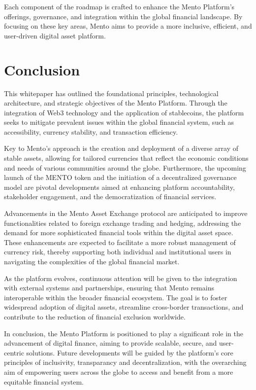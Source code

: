 \documentclass[a4paper]{article}
\theoremstyle{definition}
\begin{document}
Each component of the roadmap is crafted to enhance the Mento Platform's offerings, governance, and integration within the global financial landscape. By focusing on these key areas, Mento aims to provide a more inclusive, efficient, and user-driven digital asset platform.

\section{Conclusion}
\label{sec:conclusion}
This whitepaper has outlined the foundational principles, technological architecture, and strategic objectives of the Mento Platform. Through the integration of Web3 technology and the application of stablecoins, the platform seeks to mitigate prevalent issues within the global financial system, such as accessibility, currency stability, and transaction efficiency.

Key to Mento's approach is the creation and deployment of a diverse array of stable assets, allowing for tailored currencies that reflect the economic conditions and needs of various communities around the globe. Furthermore, the upcoming launch of the MENTO token and the initiation of a decentralized governance model are pivotal developments aimed at enhancing platform accountability, stakeholder engagement, and the democratization of financial services.

Advancements in the Mento Asset Exchange protocol are anticipated to improve functionalities related to foreign exchange trading and hedging, addressing the demand for more sophisticated financial tools within the digital asset space. These enhancements are expected to facilitate a more robust management of currency risk, thereby supporting both individual and institutional users in navigating the complexities of the global financial market.

As the platform evolves, continuous attention will be given to the integration with external systems and partnerships, ensuring that Mento remains interoperable within the broader financial ecosystem. The goal is to foster widespread adoption of digital assets, streamline cross-border transactions, and contribute to the reduction of financial exclusion worldwide.

In conclusion, the Mento Platform is positioned to play a significant role in the advancement of digital finance, aiming to provide scalable, secure, and user-centric solutions. Future developments will be guided by the platform's core principles of inclusivity, transparancy and decentralization, with the overarching aim of empowering users across the globe to access and benefit from a more equitable financial system.

\newpage


\newpage
\end{document}
